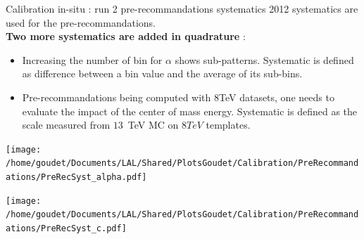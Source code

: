 \begin{frame}{Calibration in-situ : run 2 pre-recommandations systematics}
2012 systematics are used for the pre-recommandations. \\
{\bf Two more systematics are added in quadrature } :
\begin{itemize}
\item Increasing the number of bin for $\alpha$ shows sub-patterns. 
  Systematic is defined as difference between a bin value and the average of its sub-bins.
\item Pre-recommandations being computed with 8TeV datasets, one needs to evaluate the impact of the center of mass energy.
Systematic is defined as the scale measured from $13$~TeV MC on $8TeV$ templates.
\end{itemize}
  \begin{minipage}{0.49\linewidth}
    \texttt{[image: /home/goudet/Documents/LAL/Shared/PlotsGoudet/Calibration/PreRecommandations/PreRecSyst\_alpha.pdf]}
  \end{minipage}
  \hfill
  \begin{minipage}{0.49\linewidth}
    \texttt{[image: /home/goudet/Documents/LAL/Shared/PlotsGoudet/Calibration/PreRecommandations/PreRecSyst\_c.pdf]}
  \end{minipage}\\
\end{frame}

